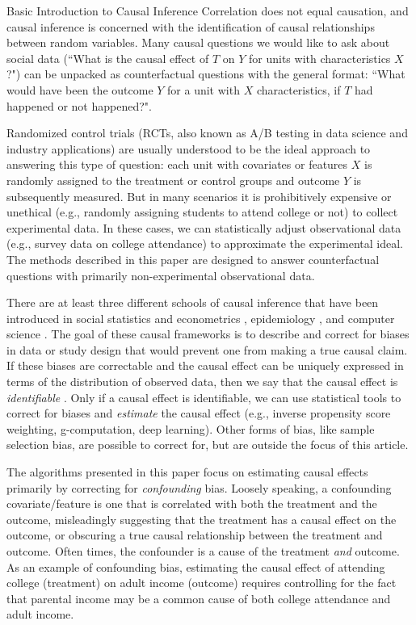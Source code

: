 \begin{TCBBox}[label=box:causalintro]{Basic Introduction to Causal Inference}
 Correlation does not equal causation, and causal inference is concerned with the identification of causal relationships between random variables. Many causal questions we would like to ask about social data (``What is the causal effect of $T$ on $Y$ for units with characteristics $X$?") can be unpacked as counterfactual questions with the general format: ``What would have been the outcome $Y$ for a unit with $X$ characteristics, if $T$ had happened or not happened?".
 
Randomized control trials (RCTs, also known as A/B testing in data science and industry applications) are usually understood to be the ideal approach to answering this type of question: each unit with covariates or features $X$ is randomly assigned to the treatment or control groups and outcome $Y$ is subsequently measured. But in many scenarios it is prohibitively expensive or unethical (e.g., randomly assigning students to attend college or not) to collect experimental data. In these cases, we can statistically adjust observational data (e.g., survey data on college attendance) to approximate the experimental ideal. The methods described in this paper are designed to answer counterfactual questions with primarily non-experimental observational data. 

There are at least three different schools of causal inference that have been introduced in social statistics and econometrics \citep{rubin1974estimating,imbens2015causal}, epidemiology \citep{robins1986new,robins1987graphical,hernancausal2020}, and computer science \citep{goldszmidt1996qualitative,pearl2009causality}. The goal of these causal frameworks is to describe and correct for biases in data or study design that would prevent one from making a true causal claim. If these biases are correctable and the causal effect can be uniquely expressed in terms of the distribution of observed data, then we say that the causal effect is \textit{identifiable} \citep{kennedy2016semiparametric}.
 Only if a causal effect is identifiable, we can use statistical tools to correct for biases and \textit{estimate} the causal effect (e.g., inverse propensity score weighting, g-computation, deep learning). Other forms of bias, like sample selection bias, are possible to correct for, but are outside the focus of this article.

The algorithms presented in this paper focus on estimating causal effects primarily by correcting for \textit{confounding} bias. Loosely speaking, a confounding covariate/feature is one that is correlated with both the treatment and the outcome, misleadingly suggesting that the treatment has a causal effect on the outcome, or obscuring a true causal relationship between the treatment and outcome. Often times, the confounder is a cause of the treatment \textit{and} outcome. As an example of confounding bias, estimating the causal effect of attending college (treatment) on adult income (outcome) requires controlling for the fact that parental income may be a common cause of both college attendance and adult income. 
\end{TCBBox}

